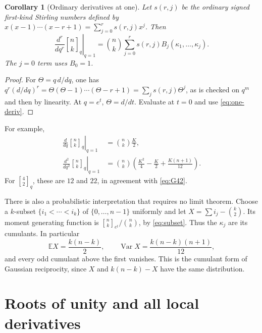 \documentclass[11pt,a4paper]{article}
\numberwithin{equation}{section}
\newtheorem{corollary}[theorem]{Corollary}
\theoremstyle{definition}
\theoremstyle{remark}
\newcommand{\qb}[2]{\genfrac{[}{]}{0pt}{}{#1}{#2}_{q}}
\newcommand{\qbb}[3]{\genfrac{[}{]}{0pt}{}{#1}{#2}_{#3}}
\begin{document}
\begin{corollary}[Ordinary derivatives at one]\label{cor:one-ordinary}
Let $s(r,j)$ be the \emph{ordinary signed} first-kind Stirling numbers defined by
$x(x-1)\cdots(x-r+1)=\sum_{j=0}^r s(r,j)x^j$. Then
\begin{equation}\label{eq:ordinary-one-jets}
 \left.\frac{d^r}{dq^r}\qb nk\right|_{q=1}
 =\binom nk\sum_{j=0}^r s(r,j)B_j(\kappa_1,\ldots,\kappa_j).
\end{equation}
The $j=0$ term uses $B_0=1$.
\end{corollary}
\begin{proof}
For $\Theta=q\,d/dq$, one has
$q^r(d/dq)^r=\Theta(\Theta-1)\cdots(\Theta-r+1)
=\sum_js(r,j)\Theta^j$, as is checked on $q^m$ and then by linearity.
At $q=e^t$, $\Theta=d/dt$. Evaluate at $t=0$ and use \eqref{eq:one-deriv}.
\end{proof}
For example,
\begin{align}
 \left.\frac d{dq}\qb nk\right|_{q=1}
 &=\binom nk\frac K2,\label{eq:first-one}\\
 \left.\frac {d^2}{dq^2}\qb nk\right|_{q=1}
 &=\binom nk\left(\frac{K^2}{4}-\frac K2+\frac{K(n+1)}{12}\right).
 \label{eq:second-one}
\end{align}
For $\qb42$, these are $12$ and $22$, in agreement with \eqref{eq:G42}.

There is also a probabilistic interpretation that requires no limit theorem.
Choose a $k$-subset $\{i_1<\cdots<i_k\}$ of $\{0,\ldots,n-1\}$ uniformly and let
$X=\sum i_j-\binom k2$. Its moment generating function is
$\qbb nk{e^t}/\binom nk$, by \eqref{eq:subset}. Thus the $\kappa_j$ are its
cumulants. In particular
\[
 \mathbb E X=\frac{k(n-k)}2,\qquad
 \operatorname{Var}X=\frac{k(n-k)(n+1)}{12},
\]
and every odd cumulant above the first vanishes. This is the cumulant form of
Gaussian reciprocity, since $X$ and $k(n-k)-X$ have the same distribution.

\section{Roots of unity and all local derivatives}\label{sec:roots}
\end{document}
